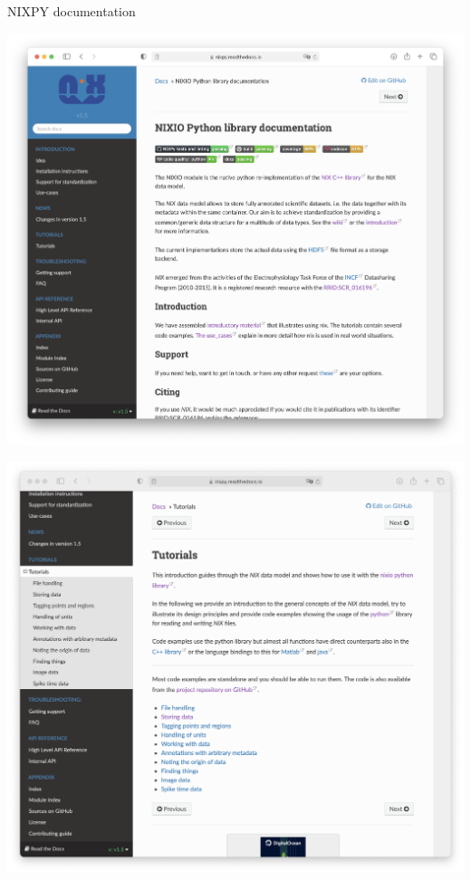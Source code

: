 \documentclass[pdftex]{beamer}
\begin{document}
\begin{frame}{NIXPY documentation}
     {
    \begin{center}
        \includegraphics[width=0.7\columnwidth]{resources/rtd_main.png}
    \end{center}
    } {
    \begin{center}
        \includegraphics[width=0.7\columnwidth]{resources/rtd_tutorials.png}
    \end{center}
    }
\end{frame}
\end{document}

